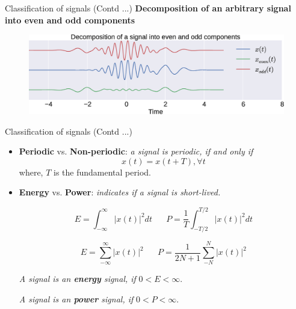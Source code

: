 \documentclass{beamer}
\begin{document}
\begin{frame}{Classification of signals (Contd ...)}
\textbf{Decomposition of an arbitrary signal into even and odd components}
\begin{figure}
\includegraphics[width=\textwidth]{img/even_odd.eps}
\end{figure}
\end{frame}

\begin{frame}{Classification of signals (Contd ...)}
\begin{itemize}
\item \textbf{Periodic} vs. \textbf{Non-periodic}: \textit{a signal is periodic, if and only if}
\[x\left(t\right) = x\left(t + T\right), \forall t\]
where, $T$ is the fundamental period.
\item \textbf{Energy} vs. \textbf{Power}: \textit{indicates if a signal is short-lived.}

\[ E = \int_{-\infty}^{\infty}\left|x(t)\right|^2dt \,\,\,\,\,\,\,\,\,\, P=\frac{1}{T}\int_{-T/2}^{T/2}\left|x(t)\right|^2dt \]

\[ E = \sum_{-\infty}^{\infty}\left|x(t)\right|^2 \,\,\,\,\,\,\,\,\,\, P=\frac{1}{2N+1}\sum_{-N}^{N}\left|x(t)\right|^2 \]

\textit{A signal is an \textbf{energy} signal, if} $0 < E < \infty$.

\textit{A signal is an \textbf{power} signal, if} $0 < P < \infty$.
\end{itemize}
\end{frame}
\end{document}
